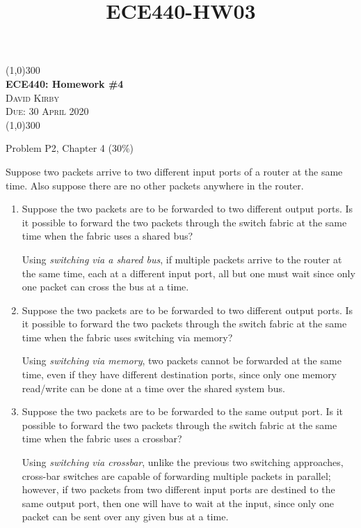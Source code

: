 \documentclass{article}
\title{ECE440-HW03}
\begin{document}
\begin{center}
    \line(1,0){300}\\[0.25cm]
 	\LARGE{\bfseries ECE440: Homework \#4}\\
 	\textsc{\LARGE David Kirby}\\
 	\textsc{\Large Due: 30 April 2020}\\
 	\line(1,0){300}\\[1.0cm]
\end{center}
\begin{enumerate}
\large{\bfseries \item Problem P2, Chapter 4 (30\%)\par
Suppose two packets arrive to two different input ports of a router at the same time. Also suppose there are no other packets anywhere in the router.%
    \begin{enumerate}
        \item Suppose the two packets are to be forwarded to two different output ports. Is it possible to forward the two packets through the switch fabric at the same time when the fabric uses a shared bus?\par
        \mdseries Using \textit{switching via a shared bus}, if multiple packets arrive to the router at the same time, each at a different input port, all but one must wait since only one packet can cross the bus at a time.\par
        \bfseries \item Suppose the two packets are to be forwarded to two different output ports. Is it possible to forward the two packets through the switch fabric at the same time when the fabric uses switching via memory?\par
        \mdseries Using \textit{switching via memory}, two packets cannot be forwarded at the same time, even if they have different destination ports, since only one memory read/write can be done at a time over the shared system bus.\par
        \bfseries \item Suppose the two packets are to be forwarded to the same output port. Is it possible to forward the two packets through the switch fabric at the same time when the fabric uses a crossbar?\par
        \mdseries Using \textit{switching via crossbar}, unlike the previous two switching approaches, cross-bar switches are capable of forwarding multiple packets in parallel; however, if two packets from two different input ports are destined to the same output port, then one will have to wait at the input, since only one packet can be sent over any given bus at a time.

\end{enumerate}}
\end{enumerate}
\end{document}
